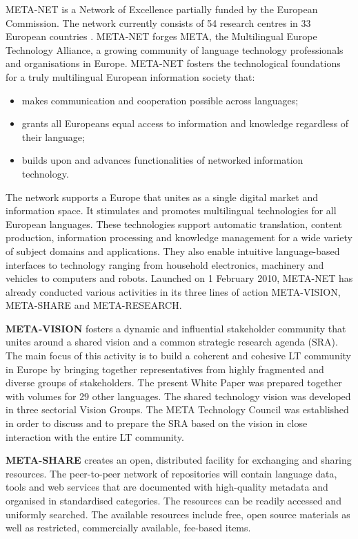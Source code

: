 \begin{multicols}{2}

META-NET is a Network of Excellence partially funded by the European Commission. The network currently consists of 54 research centres in 33 European countries \cite{rehm2011}. META-NET forges META, the Multilingual Europe Technology Alliance, a growing community of language technology professionals and organisations in Europe. META-NET fosters the technological foundations for a truly multilingual European information society that:

\begin{itemize}
\item makes communication and cooperation possible across languages;
\item grants all Europeans equal access to information and knowledge regardless of their language;
\item builds upon and advances functionalities of networked information technology.
\end{itemize}

The network supports a Europe that unites as a single digital market and information space. It stimulates and promotes multilingual technologies for all European languages. These technologies support automatic translation, content production, information processing and knowledge management for a wide variety of subject domains and applications. They also enable intuitive language-based interfaces to technology ranging from household electronics, machinery and vehicles to computers and robots.
Launched on 1 February 2010, META-NET has already conducted various activities in its three lines of action META-VISION, META-SHARE and META-RESEARCH.

\textbf{META-VISION} fosters a dynamic and influential stakeholder community that unites around a shared vision and a common strategic research agenda (SRA). The main focus of this activity is to build a coherent and cohesive LT community in Europe by bringing together representatives from highly fragmented and diverse groups of stakeholders. The present White Paper was prepared together with volumes for 29 other languages. The shared technology vision was developed in three sectorial Vision Groups. The META Technology Council was established in order to discuss and to prepare the SRA based on the vision in close interaction with the entire LT community.

\textbf{META-SHARE} creates an open, distributed facility for exchanging and sharing resources. The peer-to-peer network of repositories will contain language data, tools and web services that are documented with high-quality metadata and organised in standardised categories. The resources can be readily accessed and uniformly searched. The available resources include free, open source materials as well as restricted, commercially available, fee-based items.


\end{multicols}

